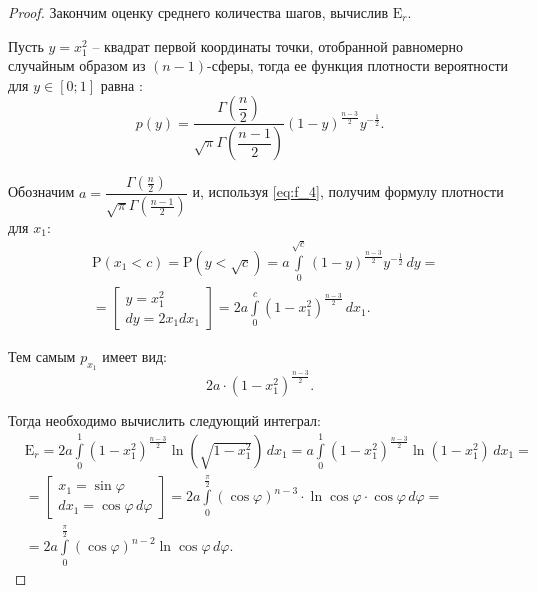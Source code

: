 \documentclass[specialist,
substylefile = spbu.rtx,
               subf,href,colorlinks=true, 12pt]{disser}
\begin{document}
\begin{proof}
Закончим оценку среднего количества шагов, вычислив $\mathrm{E}_{r}$.

Пусть $y=x_1^2$ -- квадрат первой координаты точки, отобранной равномерно случайным образом из $(n-1)$-сферы, тогда ее функция плотности вероятности для $y\in [0; 1]$ равна \cite{mardia2000directional}:
\begin{equation}
p(y)=\dfrac{\Gamma\left(\dfrac{n}{2}\right)}{\sqrt{\pi} \Gamma\left(\dfrac{n-1}{2}\right)}
(1-y)^{\frac{n-3}{2}}y^{-\frac{1}{2}}.
\label{eq:f_4}
\end{equation}

Обозначим $a=\dfrac{\Gamma\left(\frac{n}{2}\right)}{\sqrt{\pi} \Gamma\left(\frac{n-1}{2}\right)}$ и, используя \ref{eq:f_4}, получим формулу плотности для $x_1$:
\begin{equation}
\begin{aligned}
&\mathrm{P}(x_1<c)=\mathrm{P}(y<\sqrt{c})=a\int\limits_0^{\sqrt{c}}(1-y)^{\frac{n-3}{2}}y^{-\frac{1}{2}} \,dy = \\ & =  \left[\begin{array}{l}y=x_1^2\\ d y=2x_1 d x_1\end{array}\right]=2a\int\limits_0^{c}(1-x_1^2)^{\frac{n-3}{2}} \,dx_1.
\end{aligned}
\label{eq:dens}
\end{equation}
\vspace{0.5ex}

Тем самым $p_{x_1}$ имеет вид:
\begin{equation}
2a\cdot (1-x_1^2)^{\frac{n-3}{2}}.
\label{eq:dens_1}
\end{equation}
\newpage

Тогда необходимо вычислить следующий интеграл:
\begin{equation}
\begin{aligned}
   & \mathrm{E}_{r}= 2a \int\limits_0^1 (1-x_1^2)^{\frac{n-3}{2}}\ln(\sqrt{1-x_1^2})   \, d x_1 = a       
           \int\limits_0^1 (1-x_1^2)^{\frac{n-3}{2}}\ln(1-x_1^2)   \, d x_1 = \\
&= \left[\begin{array}{l}x_1 = \sin \varphi \\  d x_1= \cos \varphi \, d \varphi\end{array}\right] = 2a \int\limits_0^{\frac{\pi}{2}} (\cos \varphi)^{n-3}\cdot \ln \cos \varphi \cdot   \cos  \varphi \, d \varphi = \\ &= 2a \int\limits_0^{\frac{\pi}{2}} (\cos \varphi)^{n-2} \ln \cos \varphi \, d \varphi.
\end{aligned}
\label{eq:f_3}
\end{equation}



\end{proof}
\end{document}
